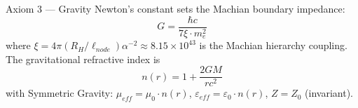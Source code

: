 %
\begin{resultbox}{Axiom 3 — Gravity}
Newton's constant sets the Machian boundary impedance:
\begin{equation}
    G = \frac{\hbar c}{7\xi \cdot m_e^2}
    \label{eq:axiom3_gravity}
\end{equation}
where $\xi = 4\pi(R_H / \ell_{node})\alpha^{-2} \approx 8.15 \times 10^{43}$ is the Machian hierarchy coupling.
The gravitational refractive index is
\begin{equation}
    n(r) = 1 + \frac{2GM}{rc^2}
    \label{eq:axiom3_refraction}
\end{equation}
with Symmetric Gravity: $\mu_{eff} = \mu_0 \cdot n(r)$,\;
$\varepsilon_{eff} = \varepsilon_0 \cdot n(r)$,\;
$Z = Z_0$ (invariant).
\end{resultbox}
